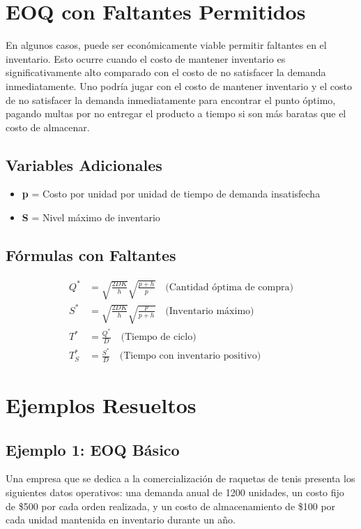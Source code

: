 \documentclass[11pt,a4paper]{article}
\begin{document}
\section{EOQ con Faltantes Permitidos}
En algunos casos, puede ser económicamente viable permitir faltantes en el inventario. Esto ocurre cuando el costo de mantener inventario es significativamente alto comparado con el costo de no satisfacer la demanda inmediatamente. Uno podría jugar con el costo de mantener inventario y el costo de no satisfacer la demanda inmediatamente para encontrar el punto óptimo, pagando multas por no entregar el producto a tiempo si son más baratas que el costo de almacenar.

\subsection{Variables Adicionales}
\begin{itemize}
    \item \textbf{p} = Costo por unidad por unidad de tiempo de demanda insatisfecha
    \item \textbf{S} = Nivel máximo de inventario
\end{itemize}

\subsection{Fórmulas con Faltantes}
\begin{align*}
Q^* &= \sqrt{\frac{2DK}{h}}\sqrt{\frac{p+h}{p}} \quad \text{(Cantidad óptima de compra)} \\
S^* &= \sqrt{\frac{2DK}{h}}\sqrt{\frac{p}{p+h}} \quad \text{(Inventario máximo)} \\
T^* &= \frac{Q^*}{D} \quad \text{(Tiempo de ciclo)} \\
T_S^* &= \frac{S^*}{D} \quad \text{(Tiempo con inventario positivo)}
\end{align*}

\section{Ejemplos Resueltos}
\subsection{Ejemplo 1: EOQ Básico}
Una empresa que se dedica a la comercialización de raquetas de tenis presenta los siguientes datos operativos: una demanda anual de 1200 unidades, un costo fijo de \$500 por cada orden realizada, y un costo de almacenamiento de \$100 por cada unidad mantenida en inventario durante un año.
\end{document}
